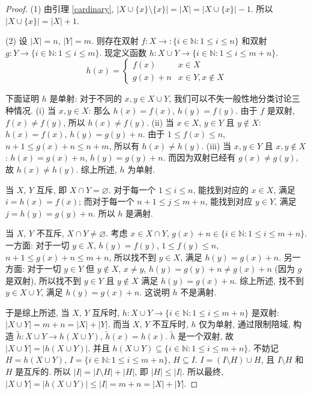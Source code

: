 \documentclass[UTF8]{ctexart}
\theoremstyle{mystyle}
\theoremstyle{myremark}
\theoremstyle{plain}
\newcommand{\N}{\mathbb N}
\newcommand{\set}[1]{\{#1\}}
\begin{document}
\begin{proof}
    (1) 由引理 \ref{cardinary}, $ |X \cup \set{x} \setminus \set{x}| = |X| = |X \cup \set{x}| - 1 $. 所以 $ |X \cup \set{x}| = |X| + 1 $.

    (2) 设 $ |X| = n $, $ |Y| = m $. 则存在双射 $ f \colon X \to \colon \set{i \in \N \colon 1 \leqslant i \leqslant n} $ 和双射 $ g \colon Y \to \set{i \in \N \colon 1 \leqslant i \leqslant m} $. 现定义函数 $ h \colon X \cup Y \to \set{i \in \N \colon 1 \leqslant i \leqslant m + n} $.
    \[ h(x) = \begin{cases}
        f(x) & x \in X \\
        g(x) + n & x \in Y, x \notin X
    \end{cases} \]

    下面证明 $ h $ 是单射: 对于不同的 $ x, y \in X \cup Y $, 我们可以不失一般性地分类讨论三种情况. (i) 当 $ x, y \in X $: 那么 $ h(x) = f(x) $, $ h(y) = f(y) $. 由于 $ f $ 是双射, $ f(x) \neq f(y) $, 所以 $ h(x) \neq f(y) $. (ii) 当 $ x \in X $, $ y \in Y $ 且 $ y \notin X $: $ h(x) = f(x) $, $ h(y) = g(y) + n $. 由于 $ 1 \leqslant f(x) \leqslant n $, $ n + 1 \leqslant g(x) + n \leqslant n + m $, 所以有 $ h(x) \neq h(y) $. (iii) 当 $ x, y \in Y $ 且 $ x, y \notin X $: $ h(x) = g(x) + n $, $ h(y) = g(y) + n $. 而因为双射已经有 $ g(x) \neq g(y) $, 故 $ h(x) \neq h(y) $. 综上所述, $ h $ 为单射.

    当 $ X $, $ Y $ 互斥, 即 $ X \cap Y = \varnothing $. 对于每一个 $ 1 \leqslant i \leqslant n $, 能找到对应的 $ x \in X $, 满足 $ i = h(x) = f(x) $; 而对于每一个 $ n + 1 \leqslant j \leqslant m + n $, 能找到对应 $ y \in Y $, 满足 $ j = h(y) = g(y) + n $. 所以 $ h $ 是满射.

    当 $ X $, $ Y $ 不互斥, $ X \cap Y \neq \varnothing $. 考虑 $ x \in X \cap Y $, $ g(x) + n \in \set{i \in \N \colon 1 \leqslant i \leqslant m + n} $. 一方面: 对于一切 $ y \in X $, $ h(y) = f(y) $, $ 1 \leqslant f(y) \leqslant n $, $ n + 1 \leqslant g(x) + n \leqslant m + n $, 所以找不到 $ y \in X $, 满足 $ h(y) = g(x) + n $. 另一方面: 对于一切 $ y \in Y $ 但 $ y \notin X $, $ x \neq y $, $ h(y) = g(y) + n \neq g(x) + n $ (因为 $ g $ 是双射), 所以找不到 $ y \in Y $ 且 $ y \notin X $ 满足 $ h(y) = g(x) + n $. 综上所述, 找不到 $ y \in X \cup Y $, 满足 $ h(y) = g(x) + n $. 这说明 $ h $ 不是满射.

    于是综上所述, 当 $ X $, $ Y $ 互斥时, $ h \colon X \cup Y \to \set{i \in \N \colon 1 \leqslant i \leqslant m + n} $ 是双射: $ |X \cup Y| = m + n = |X| + |Y| $. 而当 $ X $, $ Y $ 不互斥时, $ h $ 仅为单射, 通过限制陪域, 构造 $ \widetilde{h} \colon X \cup Y \to h(X \cup Y) $, $ \widetilde{h} (x) = h(x) $. $ \widetilde{h} $ 是一个双射, 故 $ |X \cup Y| = |h(X \cup Y)| $. 并且 $ h(X \cup Y) \subseteq \set{i \in \N \colon 1 \leqslant i \leqslant m + n} $. 不妨记 $ H = h(X \cup Y) $, $ I = \set{i \in \N \colon 1 \leqslant i \leqslant m + n} $, $ H \subseteq I $. $ I = (I \setminus H) \cup H $, 且 $ I \setminus H $ 和 $ H $ 是互斥的. 所以 $ |I| = |I \setminus H| + |H| $, 即 $ |H| \leqslant |I| $. 所以最终, $ |X \cup Y| = |h(X \cup Y)| \leqslant |I| = m + n = |X| + |Y| $.

    

\end{proof}
\end{document}
